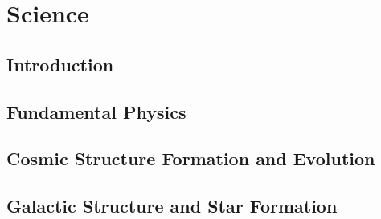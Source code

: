 \documentclass[11pt]{article}
\begin{document}
\section{Science}
\label{sec:science}

\subsection{Introduction} %











\subsection{Fundamental Physics} %
\label{sec:fundamentalsci}





\subsection{Cosmic Structure Formation and Evolution} %
\label{sec:extragalacticsci}



\subsection{Galactic Structure and Star Formation} %
\label{sec:galacticsci}

\end{document}
